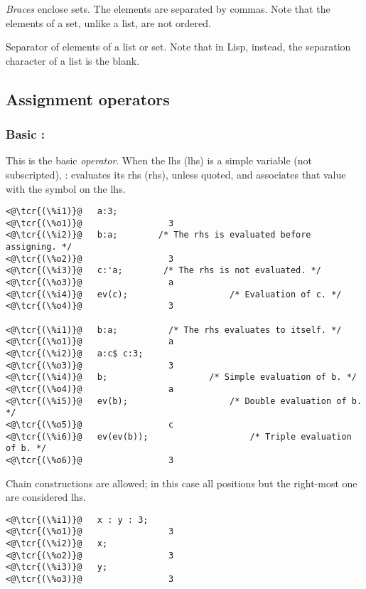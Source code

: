 \documentclass[../Maxima_Workbook.tex]{subfiles}
\begin{document}
\lzz \tcr{\emph{\{$ \dots, \dots, \dots $\}}} \hfill {}\index{\{\}}

\lz \emph{Braces}  enclose sets. The elements are separated by commas. Note that the elements of a set, unlike a list, are not ordered. 

\lzz \tcr{\emph{,}} \hfill {}

\lz Separator of elements of a list or set. Note that in Lisp, instead, the separation character of a list is the blank. 

\subsection{Assignment operators}

\subsubsection{Basic :}

\hyt{:}{\tcr{\emph{:}}} \hfill {}\index{:}

\lz This is the basic  \emph{operator}. When the lhs (lhs) is a simple variable (not subscripted), : evaluates its rhs (rhs), unless quoted, and associates that value with the symbol on the lhs. 

\lz \begin{lstlisting}
<@\tcr{(\%i1)}@   a:3;
<@\tcr{(\%o1)}@			        3
<@\tcr{(\%i2)}@   b:a;	      /* The rhs is evaluated before assigning. */
<@\tcr{(\%o2)}@			        3
<@\tcr{(\%i3)}@   c:'a;		   /* The rhs is not evaluated. */
<@\tcr{(\%o3)}@			        a
<@\tcr{(\%i4)}@   ev(c);					/* Evaluation of c. */
<@\tcr{(\%o4)}@			        3

<@\tcr{(\%i1)}@   b:a;			/* The rhs evaluates to itself. */
<@\tcr{(\%o1)}@			        a
<@\tcr{(\%i2)}@   a:c$ c:3;
<@\tcr{(\%o3)}@			        3
<@\tcr{(\%i4)}@   b;					/* Simple evaluation of b. */
<@\tcr{(\%o4)}@			        a
<@\tcr{(\%i5)}@   ev(b);			        /* Double evaluation of b. */
<@\tcr{(\%o5)}@			        c
<@\tcr{(\%i6)}@   ev(ev(b));			        /* Triple evaluation of b. */
<@\tcr{(\%o6)}@			        3
\end{lstlisting}

\lz Chain constructions are allowed; in this case all positions but the right-most one are considered lhs.

\lz \begin{lstlisting}
<@\tcr{(\%i1)}@   x : y : 3;
<@\tcr{(\%o1)}@			        3
<@\tcr{(\%i2)}@   x;
<@\tcr{(\%o2)}@			        3
<@\tcr{(\%i3)}@   y;
<@\tcr{(\%o3)}@			        3
\end{lstlisting}
\end{document}
